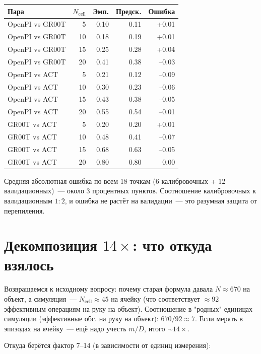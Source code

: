 \documentclass[11pt]{article}
\begin{document}
\medskip
\begin{tabular}{lrrrr}
\toprule
Пара & $N_\text{cell}$ & Эмп. & Предск. & Ошибка \\
\midrule
OpenPI vs GR00T & 5  & 0.10 & 0.11 & +0.01 \\
OpenPI vs GR00T & 10 & 0.18 & 0.19 & +0.01 \\
OpenPI vs GR00T & 15 & 0.25 & 0.28 & +0.04 \\
OpenPI vs GR00T & 20 & 0.41 & 0.38 & --0.03 \\
OpenPI vs ACT   & 5  & 0.21 & 0.12 & --0.09 \\
OpenPI vs ACT   & 10 & 0.30 & 0.23 & --0.06 \\
OpenPI vs ACT   & 15 & 0.43 & 0.38 & --0.05 \\
OpenPI vs ACT   & 20 & 0.55 & 0.54 & --0.01 \\
GR00T vs ACT    & 5  & 0.20 & 0.20 & +0.01 \\
GR00T vs ACT    & 10 & 0.48 & 0.41 & --0.07 \\
GR00T vs ACT    & 15 & 0.68 & 0.63 & --0.05 \\
GR00T vs ACT    & 20 & 0.80 & 0.80 & 0.00 \\
\bottomrule
\end{tabular}
\medskip

Средняя абсолютная ошибка по всем 18 точкам (6 калибровочных + 12 валидационных)~--- около 3 процентных пунктов. Соотношение калибровочных к валидационным $1{:}2$, и ошибка не растёт на валидации~--- это разумная защита от перепиления.

\section{Декомпозиция $14\times$: что откуда взялось}

Возвращаемся к исходному вопросу: почему старая формула давала $N \approx 670$ на объект, а симуляция~--- $N_\text{cell} \approx 45$ на ячейку (что соответствует $\approx 92$ эффективным операциям на руку на объект). Соотношение в "родных" единицах симуляции (эффективные обс. на руку на объект): $670 / 92 \approx 7$. Если мерять в эпизодах на ячейку~--- ещё надо учесть $m/D$, итого $\sim 14\times$.

Откуда берётся фактор 7--14 (в зависимости от единиц измерения):
\end{document}

